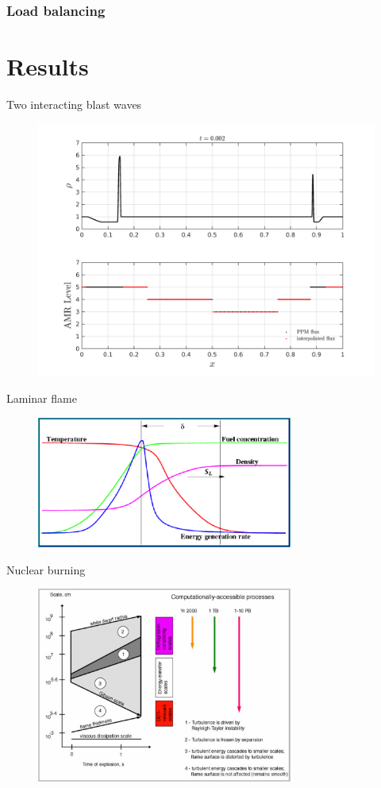 \documentclass{beamer}
\begin{document}
\begin{frame}
    \frametitle{Load balancing}
\end{frame}

\section{Results}

\begin{frame}{Two interacting blast waves}
  \begin{figure}
    \center
    \includegraphics[scale=0.4]{blast2_early.png}
  \end{figure}
\end{frame}

\begin{frame}{Laminar flame}
  \begin{figure}
    \center
      \includegraphics[width=0.75\textwidth]{laminarflame.png}
  \end{figure}
\end{frame}

\begin{frame}{Nuclear burning}
  \begin{figure}
    \center
      \includegraphics[width=0.75\textwidth]{scales.png}
  \end{figure}
\end{frame}
\end{document}
